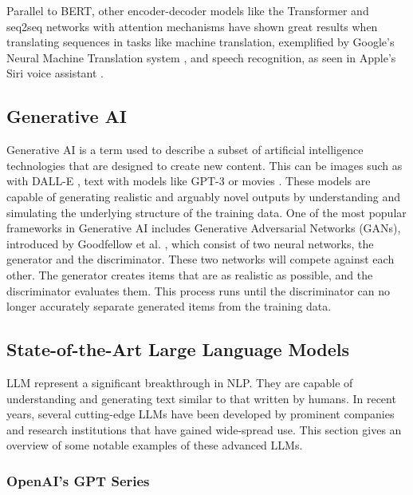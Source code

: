 Parallel to BERT, other encoder-decoder models like the Transformer \cite{vaswani_attention_2023} and \gls{seq2seq} networks with attention mechanisms \cite{bahdanau_neural_2016} have shown great results when translating sequences in tasks like machine translation, exemplified by Google's Neural Machine Translation system \cite{wu_googles_2016}, and speech recognition, as seen in Apple's Siri voice assistant \cite{hinton_deep_2012}.


\subsection{Generative AI}


Generative AI is a term used to describe a subset of artificial intelligence technologies that are designed to create new content. This can be images such as with DALL-E \cite{ramesh_zero-shot_2021}, text with models like GPT-3 \cite{brown_language_2020} or movies \cite{openai_video_2024}. These models are capable of generating realistic and arguably novel outputs by understanding and simulating the underlying structure of the training data. One of the most popular frameworks in Generative AI includes Generative Adversarial Networks (GANs), introduced by Goodfellow et al. \cite{goodfellow_generative_2014}, which consist of two neural networks, the generator and the discriminator. These two networks will compete against each other. The generator creates items that are as realistic as possible, and the discriminator evaluates them. This process runs until the discriminator can no longer accurately separate generated items from the training data.


\subsection{State-of-the-Art Large Language Models}


\gls{LLM} represent a significant breakthrough in \gls{NLP}. They are capable of understanding and generating text similar to that written by humans. In recent years, several cutting-edge LLMs have been developed by prominent companies and research institutions that have gained wide-spread use. This section gives an overview of some notable examples of these advanced LLMs.


\label{sec:openai_models}
\subsubsection{OpenAI's GPT Series}


